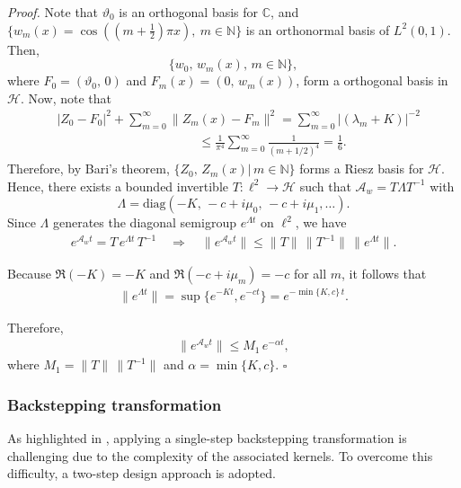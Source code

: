 \documentclass[letterpaper, 10 pt, conference]{ieeeconf}  %
\newenvironment{pf}
{\noindent\textit{Proof.}\hspace{1.2mm}}
{\hspace{\fill}$\square$}
\begin{document}
\begin{pf}
Note that $\vartheta_0$ is an orthogonal basis for $\mathbb{C}$, and $\{w_{m}(x)=\cos((m+\tfrac{1}{2})\pi x),\ m\in\mathbb{N}\}$ is an orthonormal basis of $L^{2}(0,1)$. Then, $$\{w_0,\, w_m(x),\, m\in \mathbb{N}\},$$
where $F_0 = (\vartheta_0,\, 0)$ and $F_m(x) = (0,\, w_m (x))$, form a orthogonal basis in $\mathcal{H}$. Now, note that
\begin{align*}
    &|Z_0-F_0|^2 + \sum_{m=0}^{\infty}\|Z_{m}(x)-F_{m}\|^2 = \sum_{m=0}^{\infty}|(\lambda_{m}+K)|^{-2}\\
    & ~\quad\qquad\qquad\qquad\qquad\qquad\leq \frac{1}{\pi^4}\sum_{m=0}^{\infty}\frac{1}{(m+1/2)^4} = \frac{1}{6}.
\end{align*}
Therefore, by Bari's theorem, $\{Z_{0},\,Z_{m}(x)|\, m\in \mathbb{N}\}$ forms a Riesz basis for $\mathcal{H}$. Hence, there exists a bounded invertible $T:\ell^2\to\mathcal H$ such that $\mathcal A_w=T\Lambda T^{-1}$ with $$\Lambda=\mathrm{diag}(-K,\,-c+i\mu_0,\,-c+i\mu_1,\dots).$$ 
Since $\Lambda$ generates the diagonal semigroup $e^{\Lambda t}$ on $\ell^2$, we have
\begin{align*}
e^{\mathcal A_w t}=T\,e^{\Lambda t}\,T^{-1}\quad\Rightarrow\quad
\|e^{\mathcal A_w t}\|\le \|T\|\,\|T^{-1}\|\,\|e^{\Lambda t}\|.
\end{align*}

Because $\Re(-K)=-K$ and $\Re(-c+i\mu_m)=-c$ for all $m$, it follows that
\begin{align*}
    \|e^{\Lambda t}\|=\sup\{e^{-Kt},e^{-ct}\}=e^{-\min\{K,c\}\,t}.
\end{align*}

Therefore,
\begin{align*}
    \|e^{\mathcal A_w t}\|\le M_1\,e^{-\alpha t},
\end{align*}
\noindent where $M_1=\|T\|\,\|T^{-1}\|$ and $\alpha=\min\{K,c\}$.
\end{pf}

\medskip

\subsubsection{Backstepping transformation}

As highlighted in \cite{Ren2013}, applying a single-step backstepping transformation is challenging due to the complexity of the associated kernels. To overcome this difficulty, a two-step design approach is adopted.
\end{document}
